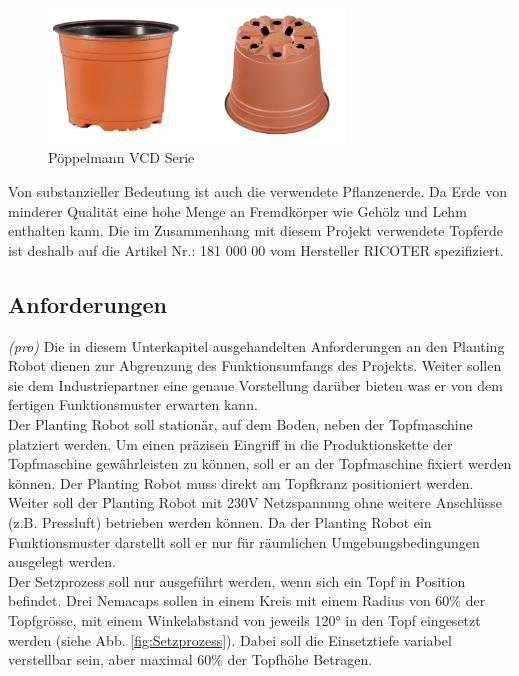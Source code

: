 \begin{figure}[H]
	\includegraphics[width=0.7\textwidth]{Illustrationen/4-Entwurf/VCD_Serie.png}
	\caption{Pöppelmann VCD Serie \protect\cite{Poeppelmann}}
	\label{fig:toepfe}
\end{figure}

Von substanzieller Bedeutung ist auch die verwendete Pflanzenerde. Da Erde von minderer Qualität eine hohe Menge an Fremdkörper wie Gehölz und Lehm enthalten kann. Die im Zusammenhang mit diesem Projekt verwendete Topferde ist deshalb auf die Artikel Nr.: 181 000 00 vom Hersteller RICOTER spezifiziert.

\subsection{Anforderungen}
\textit{(pro)} Die in diesem Unterkapitel ausgehandelten Anforderungen an den Planting Robot dienen zur Abgrenzung des Funktionsumfangs des Projekts. Weiter sollen sie dem Industriepartner eine genaue Vorstellung darüber bieten was er von dem fertigen Funktionsmuster erwarten kann.\\
\newline
Der Planting Robot soll stationär, auf dem Boden, neben der Topfmaschine platziert werden. Um einen präzisen Eingriff in die Produktionskette der Topfmaschine gewährleisten zu können, soll er an der Topfmaschine fixiert werden können. Der Planting Robot muss direkt am Topfkranz positioniert werden. Weiter soll der Planting Robot mit 230V Netzspannung ohne weitere Anschlüsse (z.B. Pressluft) betrieben werden können. Da der Planting Robot ein Funktionsmuster darstellt soll er nur für räumlichen Umgebungsbedingungen ausgelegt werden. \\
\newline
Der Setzprozess soll nur ausgeführt werden, wenn sich ein Topf in Position befindet. Drei Nemacaps sollen in einem Kreis mit einem Radius von 60$\%$ der Topfgrösse, mit einem Winkelabstand von jeweils 120° in den Topf eingesetzt werden (siehe Abb. \ref{fig:Setzprozess}). Dabei soll die Einsetztiefe variabel verstellbar sein, aber maximal 60$\%$ der Topfhöhe Betragen. 

